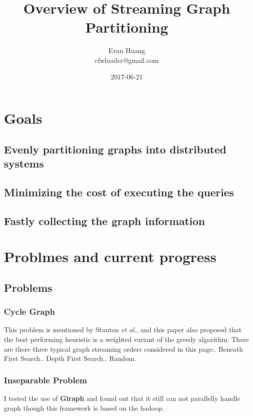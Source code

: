 \documentclass{article}
\title{Overview of Streaming Graph Partitioning}
\date{2017-06-21}
\author{Evan Huang \\ cfwloader@gmail.com}
\begin{document}
	\maketitle

	\newpage

	\tableofcontents


	\newpage
	\section{Goals}
	\subsection{Evenly partitioning graphs into distributed systems}
	\subsection{Minimizing the cost of executing the queries}
	\subsection{Fastly collecting the graph information}

	\newpage
	\section{Problmes and current progress}
	\subsection{Problems}
	\subsubsection{Cycle Graph}
	This problem is mentioned by Stanton \emph{et al.}\cite{stanton2012streaming}, and this paper also proposed that the best performing heuristic is a weighted variant of the greedy algorithm. There are there three typical graph streaming orders considered in this page:. Beneath First Search.. Depth First Search.. Random.\newline

	\subsubsection{Inseparable Problem}
	I tested the use of \textbf{Giraph}\cite{giraph} and found out that it still can not parallelly handle graph though this framework is based on the hadoop\cite{hadoop}.
\end{document}
